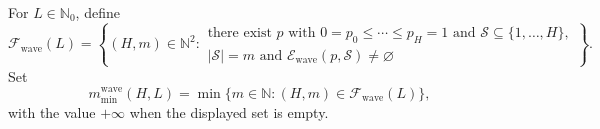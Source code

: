 For \(L\in\mathbb N_0\), define
\[
 \mathcal F_{\mathrm{wave}}(L)
 =\left\{(H,m)\in\mathbb N^2:
 \begin{array}{l}
 \text{there exist }p\text{ with }0=p_0\leq\cdots\leq p_H=1
 \text{ and }\mathcal S\subseteq\{1,\ldots,H\},\\
 |\mathcal S|=m\text{ and }\mathcal E_{\mathrm{wave}}(p,\mathcal S)\ne\varnothing
 \end{array}
 \right\}.
\]
Set
\[
 m_{\min}^{\mathrm{wave}}(H,L)
 =\min\{m\in\mathbb N:(H,m)\in\mathcal F_{\mathrm{wave}}(L)\},
\]
with the value \(+\infty\) when the displayed set is empty.